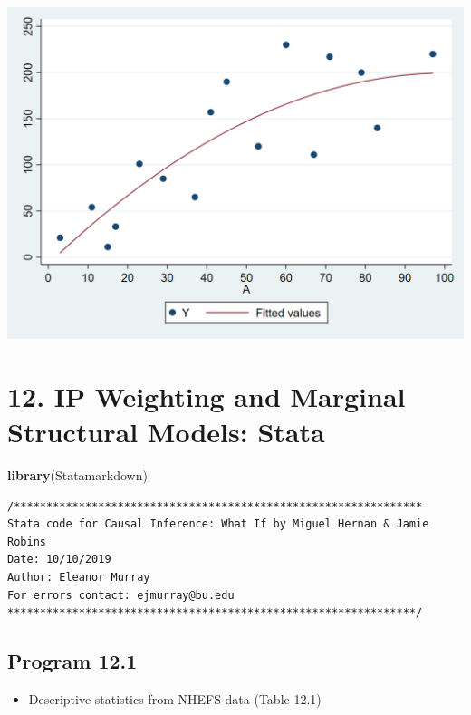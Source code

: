 \documentclass[
  10pt,
]{book}
\newenvironment{Shaded}{\begin{snugshade}}{\end{snugshade}}
\newcommand{\KeywordTok}[1]{\textcolor[rgb]{0.13,0.29,0.53}{\textbf{#1}}}
\newcommand{\NormalTok}[1]{#1}
\providecommand{\tightlist}{%
  \setlength{\itemsep}{0pt}\setlength{\parskip}{0pt}}
\begin{document}
\begin{center}\includegraphics[width=0.85\linewidth]{figs/stata-fig-11-5} \end{center}

\hypertarget{ip-weighting-and-marginal-structural-models-stata}{%
\chapter*{12. IP Weighting and Marginal Structural Models: Stata}\label{ip-weighting-and-marginal-structural-models-stata}}

\begin{Shaded}
\begin{Highlighting}[]
\KeywordTok{library}\NormalTok{(Statamarkdown)}
\end{Highlighting}
\end{Shaded}

\begin{verbatim}
/***************************************************************
Stata code for Causal Inference: What If by Miguel Hernan & Jamie Robins
Date: 10/10/2019
Author: Eleanor Murray 
For errors contact: ejmurray@bu.edu
***************************************************************/
\end{verbatim}

\hypertarget{program-12.1-1}{%
\section{Program 12.1}\label{program-12.1-1}}

\begin{itemize}
\tightlist
\item
  Descriptive statistics from NHEFS data (Table 12.1)
\end{itemize}
\end{document}
